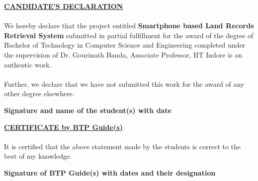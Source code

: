 \documentclass{article}
\begin{document}

{
    \begin{center}
        \textbf{\underline{\large{CANDIDATE’S DECLARATION}}}
    \end{center}

    \paragraph{}
    We hereby declare that the project entitled \textbf{Smartphone based Land Records Retrieval System} submitted in partial fulfillment for the award of the degree of Bachelor of Technology in Computer Science and Engineering completed under the supervision of Dr. Gourinath Banda, Associate Professor, IIT Indore is an authentic work.

    \paragraph{}
    Further, we declare that we have not submitted this work for the award of any other degree elsewhere.

    \vspace{4cm}
    \begin{flushright}
        \textbf{Signature and name of the student(s) with date}
    \end{flushright}
    \vspace{1cm}

    \begin{center}
        \textbf{\underline{\large{CERTIFICATE by BTP Guide(s)}}}
    \end{center}

    \paragraph{}
    It is certified that the above statement made by the students is correct to the best of my knowledge.

    \vspace{3cm}
    \begin{flushright}
        \textbf{Signature of BTP Guide(s) with dates and their designation}
    \end{flushright}

    \thispagestyle{empty}
}
\clearpage

\end{document}
